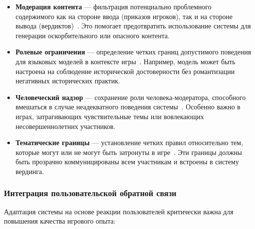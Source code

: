 \begin{itemize}
    \item \textbf{Модерация контента} — фильтрация потенциально проблемного содержимого как на стороне ввода (приказов игроков), так и на стороне вывода (вердиктов)~\cite{gehman2020realtoxicityprompts}. Это помогает предотвратить использование системы для генерации оскорбительного или опасного контента.

    \item \textbf{Ролевые ограничения} — определение четких границ допустимого поведения для языковых моделей в контексте игры~\cite{wang2023rolellm}. Например, модель может быть настроена на соблюдение исторической достоверности без романтизации негативных исторических практик.

    \item \textbf{Человеческий надзор} — сохранение роли человека-модератора, способного вмешаться в случае неадекватного поведения системы~\cite{ouyang2022training}. Особенно важно в играх, затрагивающих чувствительные темы или вовлекающих несовершеннолетних участников.

    \item \textbf{Тематические границы} — установление четких правил относительно тем, которые могут или не могут быть затронуты в игре~\cite{dinan2019build}. Эти границы должны быть прозрачно коммуницированы всем участникам и встроены в систему вердинга.
\end{itemize}

\subsubsection{Интеграция пользовательской обратной связи}

Адаптация системы на основе реакции пользователей критически важна для повышения качества игрового опыта:


